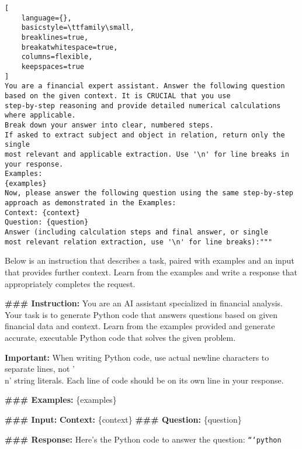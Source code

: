 \documentclass[logo,msc]{infthesis}           %
\begin{document}
\begin{tcolorbox}[
    breakable,
    enhanced,
    colback=blue!5!white,
    colframe=white!75!black,
    width=\textwidth,
    boxrule=0.5mm,
    left=2pt,
    right=2pt,
    top=2pt,
    bottom=2pt,
    title=LLAMA3-8B WITH FSP+CoT Prompt,
    fonttitle=\bfseries\small,
    coltitle=black,
    toptitle=1mm,
    bottomtitle=1mm
]
\begin{lstlisting}[
    language={},
    basicstyle=\ttfamily\small,
    breaklines=true,
    breakatwhitespace=true,
    columns=flexible,
    keepspaces=true
]
You are a financial expert assistant. Answer the following question 
based on the given context. It is CRUCIAL that you use 
step-by-step reasoning and provide detailed numerical calculations where applicable. 
Break down your answer into clear, numbered steps. 
If asked to extract subject and object in relation, return only the single 
most relevant and applicable extraction. Use '\n' for line breaks in your response.
Examples:
{examples}
Now, please answer the following question using the same step-by-step 
approach as demonstrated in the Examples:
Context: {context}
Question: {question}
Answer (including calculation steps and final answer, or single 
most relevant relation extraction, use '\n' for line breaks):"""
\end{lstlisting}
\end{tcolorbox}

\begin{tcolorbox}[
    fonttitle=\bfseries\small,
    breakable,
    enhanced,
    colback=blue!5!white,
    colframe=white!75!black,
    width=\textwidth,
    boxrule=0.5mm,
    left=2pt,
    right=2pt,
    top=2pt,
    bottom=2pt,
    title=Improved Few Shot Prompt for Code Generation and Execution,
    fonttitle=\bfseries\small,
    coltitle=black,
    toptitle=1mm,
    bottomtitle=1mm
]

\label{prompt-codegen-python}
\small

Below is an instruction that describes a task, paired with examples and an input that provides further context. Learn from the examples and write a response that appropriately completes the request.

\textbf{### Instruction:} You are an AI assistant specialized in financial analysis. Your task is to generate Python code that answers questions based on given financial data and context. Learn from the examples provided and generate accurate, executable Python code that solves the given problem.

\textbf{Important:} When writing Python code, use actual newline characters to separate lines, not '\\n' string literals. Each line of code should be on its own line in your response.

\textbf{### Examples:} \{examples\}

\textbf{### Input:}
\textbf{Context:} \{context\}
\textbf{### Question:} \{question\}

\textbf{### Response:}
Here's the Python code to answer the question:
\texttt{```python}
\end{tcolorbox}
\end{document}
